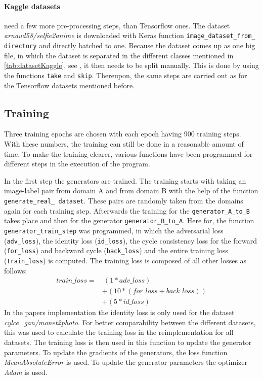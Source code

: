 \documentclass[fleqn,10pt]{SelfArx} %
\begin{document}
\paragraph{Kaggle datasets} need a few more pre-processing steps, than Tensorflow ones. The dataset \textit{arnaud58/selfie2anime} is downloaded with Keras function \texttt{image\_dataset\_from\_ directory} and directly batched to one. Because the dataset comes up as one big file, in which the dataset is separated in the different classes mentioned in \autoref{tab:datasetKaggle}, see \cite{kaggle-dataset}, it then needs to be split manually. This is done by using the functions \texttt{take} and \texttt{skip}. Thereupon, the same steps are carried out as for the Tensorflow datasets mentioned before.


\subsection{Training}
Three training epochs are chosen with each epoch having 900 training steps. With these numbers, the training can still be done in a reasonable amount of time. To make the training clearer, various functions have been programmed for different steps in the execution of the program.
 
In the first step the generators are trained. The training starts with taking an image-label pair from domain A and from domain B with the help of the function \texttt{generate\_real\_ dataset}. These pairs are randomly taken from the domains again for each training step. Afterwards the training for the \texttt{generator\_A\_to\_B} takes place and then for the generator \texttt{generator\_B\_to\_A}. Here for, the function \texttt{generator\_train\_step} was programmed, in which the adversarial loss (\texttt{adv\_loss}), the identity loss (\texttt{id\_loss}), the cycle consistency loss for the forward (\texttt{for\_loss}) and backward cycle (\texttt{back\_loss}) and the entire training loss (\texttt{train\_loss}) is computed. The training loss is composed of all other losses as follows:
\begin{equation*}
\begin{split}
train\_loss = &~(1 * adv\_loss) \\
&+ (10 * (for\_loss + back\_loss)) \\
&+ (5 * id\_loss)
\end{split}
\end{equation*}
In the papers implementation the identity loss is only used for the dataset \textit{cylce\_gan/monet2photo}. For better comparability between the different datasets, this was used to calculate the training loss in the reimplementation for all datasets. The training loss is then used in this function to update the generator parameters. To update the gradients of the generators, the loss function \textit{MeanAbsoluteError} is used. To update the generator parameters the optimizer \textit{Adam} is used.~\cite{image-to-image-ccan, google-Adam, google-GradientTape}
\end{document}
